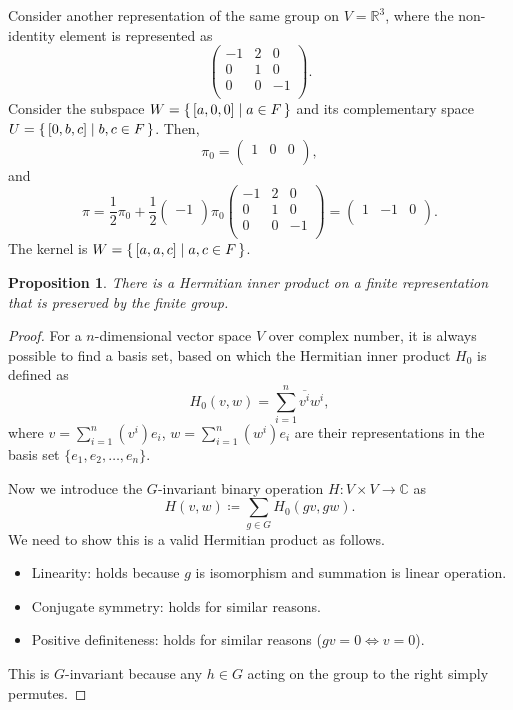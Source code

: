 \documentclass[12pt, letterpaper]{article}
\newcommand{\re}{\mathbb{R}}
\newcommand{\co}{\mathbb{C}}
\newcommand{\define}{\coloneqq}
\newcommand{\conj}{\overline}
\newtheorem{prop}{Proposition}[section]
\theoremstyle{definition}
\theoremstyle{remark}
\theoremstyle{definition}
\theoremstyle{plain}
\numberwithin{equation}{section}
\begin{document}
	Consider another representation of the same group on $V=\re^3$,
	where the non-identity element is represented as
	\[
	\begin{pmatrix}
		-1&2&0\\
		0&1&0\\
		0&0&-1\\
	\end{pmatrix}.
	\]
	Consider the subspace $W=\set{[a,0,0]|a\in F}$
	and its complementary space $U=\set{[0,b,c]|b,c\in F}$.
	Then,
	\begin{equation}
		\pi_0=
		\begin{pmatrix}
			1&0&0\\
		\end{pmatrix},
	\end{equation}
	and
	\[
	\pi=\frac{1}{2}\pi_0+
	\frac{1}{2}
	\begin{pmatrix}
		-1\\
	\end{pmatrix}
	\pi_0
	\begin{pmatrix}
		-1&2&0\\
		0&1&0\\
		0&0&-1\\
	\end{pmatrix}=
	\begin{pmatrix}
		1&-1&0\\
	\end{pmatrix}.
	\]
	The kernel is $W=\set{[a,a,c]|a,c\in F}$.
	
	\begin{prop}\label{propHermPreserve}
		There is a Hermitian inner product on a finite representation that is preserved by the finite group.
	\end{prop}
	\begin{proof}
		For a $n$-dimensional vector space $V$ over complex number,
		it is always possible to find a basis set,
		based on which the Hermitian inner product $H_0$
		is defined as
		\[H_0(v,w)=\sum_{i=1}^{n}\conj{v^i}w^i,\]
		where $v=\sum_{i=1}^{n}(v^i)e_i$, $w=\sum_{i=1}^{n}(w^i)e_i$
		are their representations in the basis set
		$\{e_1,e_2,\dots,e_n\}$.
		
		Now we introduce the $G$-invariant binary operation $H\colon V \times V \to \co$ as
		\[H(v,w)\define\sum_{g\in G}H_0(gv,gw).\]
		We need to show this is a valid Hermitian product as follows.
		\begin{itemize}
			\item Linearity: holds because $g$ is isomorphism and summation is linear operation.
			\item Conjugate symmetry: holds for similar reasons.
			\item Positive definiteness: holds for similar reasons ($gv=0\iff v=0$).
		\end{itemize}
		This is $G$-invariant because any $h\in G$ acting on the group to the right simply permutes.
	\end{proof}
\end{document}
